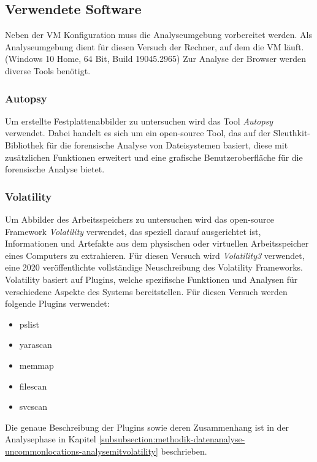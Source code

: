 \subsection*{Verwendete Software}
\label{subsection:methodik-vorbereitung-verwendetesoftware}
Neben der VM Konfiguration muss die Analyseumgebung vorbereitet werden. Als Analyseumgebung dient für diesen Versuch der Rechner, auf dem die VM läuft. (Windows 10 Home, 64 Bit, Build 19045.2965)
Zur Analyse der Browser werden diverse Tools benötigt.

\subsubsection*{Autopsy}
\label{subsubsection:methodik-vorbereitung-verwendetesoftware-autopsy}
Um erstellte Festplattenabbilder zu untersuchen wird das Tool \textit{Autopsy} verwendet. Dabei handelt es sich um ein open-source Tool, das auf der Sleuthkit-Bibliothek für die forensische Analyse von Dateisystemen basiert, diese mit zusätzlichen Funktionen erweitert und eine grafische Benutzeroberfläche für die forensische Analyse bietet. \cite{Autopsy.29.03.2023} 

\subsubsection*{Volatility}
\label{subsubsection:methodik-vorbereitung-verwendetesoftware-volatility}
Um Abbilder des Arbeitsspeichers zu untersuchen wird das open-source Framework \textit{Volatility} verwendet, das speziell darauf ausgerichtet ist, Informationen und Artefakte aus dem physischen oder virtuellen Arbeitsspeicher eines Computers zu extrahieren.
Für diesen Versuch wird \textit{Volatility3} verwendet, eine 2020 veröffentlichte vollständige Neuschreibung des Volatility Frameworks.
Volatility basiert auf Plugins, welche spezifische Funktionen und Analysen für verschiedene Aspekte des Systems bereitstellen. \cite{GitHub.05.06.2023} Für diesen Versuch werden folgende Plugins verwendet:
\begin{itemize}
\item pslist	
\item yarascan		
\item memmap	 	
\item filescan
\item svcscan
\end{itemize}
Die genaue Beschreibung der Plugins sowie deren Zusammenhang ist in der Analysephase in Kapitel \ref{subsubsection:methodik-datenanalyse-uncommonlocations-analysemitvolatility} beschrieben.

